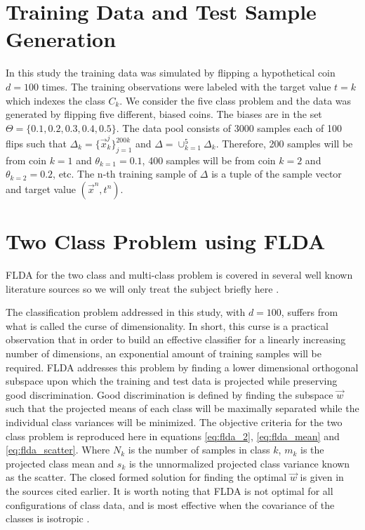 \documentclass[journal]{IEEEtran}
\begin{document}
\section{Training Data and Test Sample Generation}
\par In this study the training data was simulated by flipping a hypothetical coin \(d=100\) times. The training observations were labeled with the target value \(t = k\) which indexes the class \(C_k\). We consider the five class problem and the data was generated by flipping five different, biased coins. The biases are in the set \(\Theta = \{0.1, 0.2, 0.3, 0.4, 0.5\}\). The data pool consists of 3000 samples each of 100 flips such that \(\Delta_k = \{\vec{x}_k^j\}_{j=1}^{200k}\) and \(\Delta = \cup_{k=1}^5{\Delta_k}\). Therefore, 200 samples will be from coin \(k=1\) and \(\theta_{k=1} = 0.1\), 400 samples will be from coin \(k=2\) and \(\theta_{k=2} = 0.2\), etc. The n-th training sample of \(\Delta\) is a tuple of the sample vector and target value \((\vec{x}^n, t^n)\).

\section{Two Class Problem using FLDA}
\par FLDA for the two class and multi-class problem is covered in several well known literature sources so we will only treat the subject briefly here \cite[p.~124-128]{alpaydin}\cite[p.~105-112]{bishop1}\cite[p.~186-192]{bishop2}\cite[p.~117-124]{duda}.

\par The classification problem addressed in this study, with \(d=100\), suffers from what is called the curse of dimensionality. In short, this curse is a practical observation that in order to build an effective classifier for a linearly increasing number of dimensions, an exponential amount of training samples will be required. FLDA addresses this problem by finding a lower dimensional orthogonal subspace upon which the training and test data is projected while preserving good discrimination. Good discrimination is defined by finding the subspace \(\vec{w}\) such that the projected means of each class will be maximally separated while the individual class variances will be minimized. The objective criteria for the two class problem is reproduced here in equations \ref{eq:flda_2}, \ref{eq:flda_mean} and \ref{eq:flda_scatter}. Where \(N_k\) is the number of samples in class \(k\), \(m_k\) is the projected class mean and \(s_k\) is the unnormalized projected class variance known as the scatter. The closed formed solution for finding the optimal \(\vec{w}\) is given in the sources cited earlier. It is worth noting that FLDA is not optimal for all configurations of class data, and is most effective when the covariance of the classes is isotropic \cite[p.~108]{bishop1}.
\end{document}
